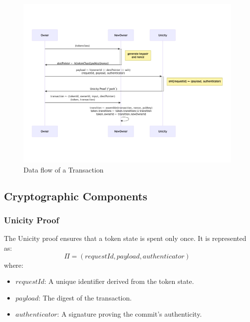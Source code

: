 \begin{figure}[!htbp]
    \begin{center}
    \includegraphics[width=\textwidth]{unicity-tx}
    \caption{Data flow of a Transaction}\label{fig:tx}
    \end{center}
\end{figure}


\subsection{Cryptographic Components}

\subsubsection{Unicity Proof}

The Unicity proof ensures that a token state is spent only once. It is represented as:
\[
\Pi = (requestId, payload, authenticator)
\]
where:
\begin{itemize}
  \item\( requestId \): A unique identifier derived from the token state.
  \item\( payload \): The digest of the transaction.
  \item\( authenticator \): A signature proving the commit's authenticity.
\end{itemize}

